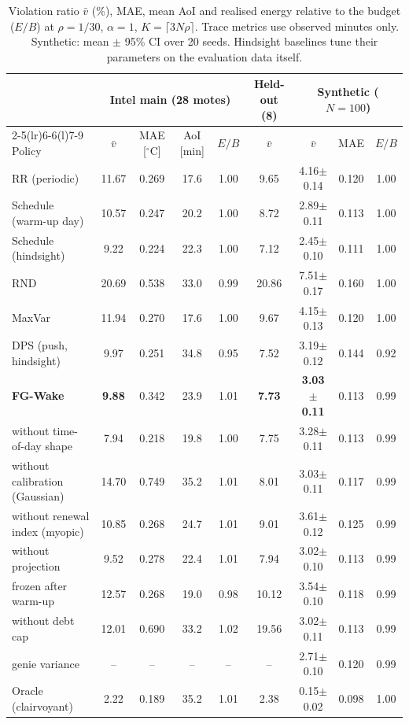 \begin{table}[t]
\centering
\caption{Violation ratio $\bar v$ (\%), MAE, mean AoI and realised energy relative to the budget ($E/B$) at $\rho=1/30$, $\alpha=1$, $K=\lceil3N\rho\rceil$. Trace metrics use observed minutes only. Synthetic: mean $\pm$ 95\% CI over 20 seeds. Hindsight baselines tune their parameters on the evaluation data itself.}
\label{tab:main}
\setlength{\tabcolsep}{5pt}
\small
\begin{tabular}{@{}lcccccccc@{}}
\toprule
 & \multicolumn{4}{c}{Intel main (28 motes)} & Held-out (8) & \multicolumn{3}{c}{Synthetic ($N{=}100$)}\\
\cmidrule(lr){2-5}\cmidrule(lr){6-6}\cmidrule(l){7-9}
Policy & $\bar v$ & MAE [$^\circ$C] & AoI [min] & $E/B$ & $\bar v$ & $\bar v$ & MAE & $E/B$\\
\midrule
RR (periodic) & 11.67 & 0.269 & 17.6 & 1.00 & 9.65 & 4.16$\pm$0.14 & 0.120 & 1.00\\
Schedule (warm-up day) & 10.57 & 0.247 & 20.2 & 1.00 & 8.72 & 2.89$\pm$0.11 & 0.113 & 1.00\\
Schedule (hindsight) & 9.22 & 0.224 & 22.3 & 1.00 & 7.12 & 2.45$\pm$0.10 & 0.111 & 1.00\\
RND & 20.69 & 0.538 & 33.0 & 0.99 & 20.86 & 7.51$\pm$0.17 & 0.160 & 1.00\\
MaxVar & 11.94 & 0.270 & 17.6 & 1.00 & 9.67 & 4.15$\pm$0.13 & 0.120 & 1.00\\
DPS (push, hindsight) & 9.97 & 0.251 & 34.8 & 0.95 & 7.52 & 3.19$\pm$0.12 & 0.144 & 0.92\\
\midrule
\textbf{FG-Wake} & \textbf{9.88} & 0.342 & 23.9 & 1.01 & \textbf{7.73} & \textbf{3.03$\pm$0.11} & 0.113 & 0.99\\
\quad without time-of-day shape & 7.94 & 0.218 & 19.8 & 1.00 & 7.75 & 3.28$\pm$0.11 & 0.113 & 0.99\\
\quad without calibration (Gaussian) & 14.70 & 0.749 & 35.2 & 1.01 & 8.01 & 3.03$\pm$0.11 & 0.117 & 0.99\\
\quad without renewal index (myopic) & 10.85 & 0.268 & 24.7 & 1.01 & 9.01 & 3.61$\pm$0.12 & 0.125 & 0.99\\
\quad without projection & 9.52 & 0.278 & 22.4 & 1.01 & 7.94 & 3.02$\pm$0.10 & 0.113 & 0.99\\
\quad frozen after warm-up & 12.57 & 0.268 & 19.0 & 0.98 & 10.12 & 3.54$\pm$0.10 & 0.118 & 0.99\\
\quad without debt cap & 12.01 & 0.690 & 33.2 & 1.02 & 19.56 & 3.02$\pm$0.11 & 0.113 & 0.99\\
\quad genie variance & -- & -- & -- & -- & -- & 2.71$\pm$0.10 & 0.120 & 0.99\\
\midrule
Oracle (clairvoyant) & 2.22 & 0.189 & 35.2 & 1.01 & 2.38 & 0.15$\pm$0.02 & 0.098 & 1.00\\
\bottomrule
\end{tabular}
\vspace{-3mm}
\end{table}
